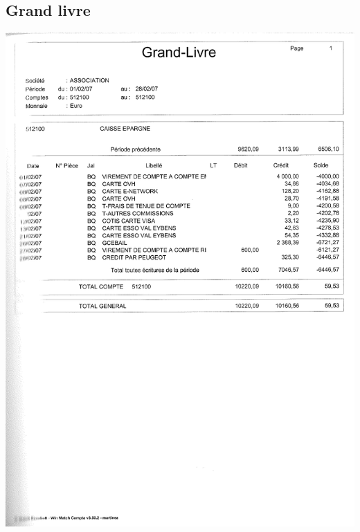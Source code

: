 \subsection{Grand livre}
\begin{center}
\includegraphics[scale=0.7]{annexes/images/grand-livre.pdf}
\end{center}
